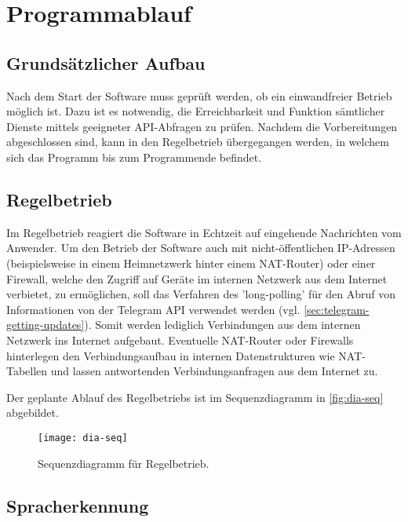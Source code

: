 \section{Programmablauf}

\subsection{Grundsätzlicher Aufbau}
\label{sec:grundsaetzlicher-aufbau}

Nach dem Start der Software muss geprüft werden, ob ein einwandfreier Betrieb möglich ist. Dazu ist es notwendig, die Erreichbarkeit und Funktion sämtlicher Dienste mittels geeigneter API-Abfragen zu prüfen. Nachdem die Vorbereitungen abgeschlossen sind, kann in den Regelbetrieb übergegangen werden, in welchem sich das Programm bis zum Programmende befindet. 

\subsection{Regelbetrieb}

Im Regelbetrieb reagiert die Software in Echtzeit auf eingehende Nachrichten vom Anwender. 
Um den Betrieb der Software auch mit nicht-öffentlichen IP-Adressen (beispielsweise in einem Heimnetzwerk hinter einem NAT-Router) oder einer Firewall, welche den Zugriff auf Geräte im internen Netzwerk aus dem Internet verbietet, zu ermöglichen, soll das Verfahren des 'long-polling' für den Abruf von Informationen von der Telegram API verwendet werden (vgl. \autoref{sec:telegram-getting-updates}). Somit werden lediglich Verbindungen aus dem internen Netzwerk ins Internet aufgebaut. Eventuelle NAT-Router oder Firewalls hinterlegen den Verbindungsaufbau in internen Datenstrukturen wie NAT-Tabellen und lassen antwortenden Verbindungsanfragen aus dem Internet zu.

Der geplante Ablauf des Regelbetriebs ist im Sequenzdiagramm in \autoref{fig:dia-seq} abgebildet.

\newpage

\begin{figure}[h!]
\centering
\texttt{[image: dia-seq]}
\caption{Sequenzdiagramm für Regelbetrieb.}
\label{fig:dia-seq}
\end{figure}

\subsection{Spracherkennung}

